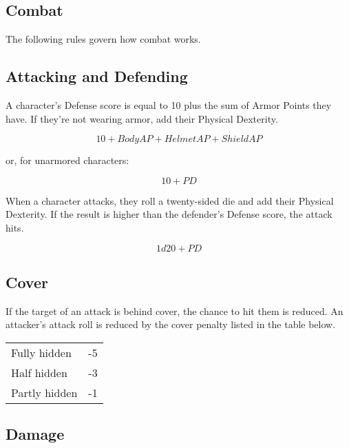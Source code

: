 \begin{multicols}{2}
\section{Combat}

The following rules govern how combat works.

\subsection{Attacking and Defending}

A character's Defense score is equal to 10 plus the sum of Armor Points they
have. If they're not wearing armor, add their Physical Dexterity.

$$10 + Body AP + Helmet AP + Shield AP$$

or, for unarmored characters:

$$10 + PD$$

When a character attacks, they roll a twenty-sided die and add their Physical
Dexterity. If the result is higher than the defender's Defense score, the attack hits.

$$1d20 + PD$$

\subsection{Cover}

If the target of an attack is behind cover, the chance to hit them is reduced.
An attacker's attack roll is reduced by the cover penalty listed in the table
below.

\begin{center}
{
\begin{xtabular}{|l|l|}
Fully hidden & -5 \\
Half hidden & -3 \\
Partly hidden & -1 \\
\hline
\end{xtabular}
}
\end{center}

\subsection{Damage}


\end{multicols}
